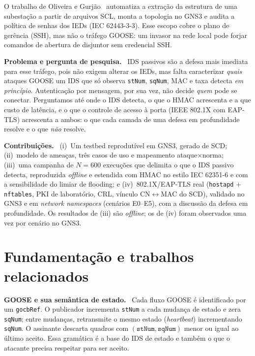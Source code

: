 \documentclass[12pt]{article}
\renewcommand{\paragraph}[1]{\par\noindent\textbf{#1}\ }
\begin{document}
O trabalho de Oliveira e Gurj\~ao~\cite{oliveira2025analisador} automatiza a extra\c{c}\~ao da estrutura de uma subesta\c{c}\~ao a partir de arquivos SCL, monta a topologia no GNS3 e audita a pol\'itica de senhas dos IEDs (IEC 62443-3-3). Esse escopo cobre o plano de ger\^encia (SSH), mas n\~ao o tr\'afego GOOSE: um invasor na rede local pode forjar comandos de abertura de disjuntor sem credencial SSH.

\paragraph{Problema e pergunta de pesquisa.} IDS passivos s\~ao a defesa mais imediata para esse tr\'afego, pois n\~ao exigem alterar os IEDs, mas falta caracterizar \emph{quais} ataques GOOSE um IDS que s\'o observa \texttt{stNum}, \texttt{sqNum}, MAC e taxa detecta \emph{em princ\'ipio}. Autentica\c{c}\~ao por mensagem, por sua vez, n\~ao decide \emph{quem} pode se conectar. Perguntamos at\'e onde o IDS detecta, o que o HMAC acrescenta e a que custo de lat\^encia, e o que o controle de acesso \`a porta (IEEE 802.1X com EAP-TLS) acrescenta a ambos: o que cada camada de uma defesa em profundidade resolve e o que \emph{n\~ao} resolve.

\paragraph{Contribui\c{c}\~oes.} (i)~Um testbed reprodut\'ivel em GNS3, gerado de SCD; (ii)~modelo de amea\c{c}as, tr\^es casos de uso e mapeamento ataque$\times$norma; (iii)~uma campanha de $N=600$ execu\c{c}\~oes que delimita o que o IDS passivo detecta, reproduzida \emph{offline} e estendida com HMAC no estilo IEC 62351-6 e com a sensibilidade do limiar de flooding; e (iv)~802.1X/EAP-TLS real (\texttt{hostapd} $+$ \texttt{nftables}, PKI de laborat\'orio, CRL, v\'inculo CN$\leftrightarrow$MAC do SCD), validado no GNS3 e em \emph{network namespaces} (cen\'arios E0--E5), com a discuss\~ao da defesa em profundidade. Os resultados de (iii) s\~ao \emph{offline}; os de (iv) foram observados uma vez por cen\'ario no GNS3.

\section{Fundamenta\c{c}\~ao e trabalhos relacionados}

\paragraph{GOOSE e sua sem\^antica de estado.} Cada fluxo GOOSE \'e identificado por um \texttt{gocbRef}. O publicador incrementa \texttt{stNum} a cada mudan\c{c}a de estado e zera \texttt{sqNum}; entre mudan\c{c}as, retransmite o mesmo estado (\emph{heartbeat}) incrementando \texttt{sqNum}. O assinante descarta quadros com $(\texttt{stNum},\texttt{sqNum})$ menor ou igual ao \'ultimo aceito. Essa gram\'atica \'e a base do IDS de estado e tamb\'em o que o atacante precisa respeitar para ser aceito.
\end{document}
